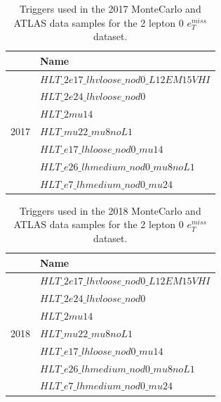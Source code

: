 \begin{table}[H]
    \centering
    \caption[2017 triggers table]{Triggers used in the 2017 MonteCarlo and ATLAS data samples for the 2 lepton 0 $e_T^{miss}$ dataset.}
    \label{tab:triggers2017}
    \begin{tabular}{|l|l|}
    \hline
                            & Name  \\ \hline
    \multirow{7}{*}{2017} & $HLT\_2e17\_lhvloose\_nod0\_L12EM15VHI$                   \\ \cline{2-2} 
                            & $HLT\_2e24\_lhvloose\_nod0$                     \\ \cline{2-2} 
                            & $HLT\_2mu14$                  \\ \cline{2-2} 
                            &  $HLT\_mu22\_mu8noL1$                 \\ \cline{2-2} 
                            &  $HLT\_e17\_lhloose\_nod0\_mu14$                \\ \cline{2-2} 
                            &   $HLT\_e26\_lhmedium\_nod0\_mu8noL1$                \\ \cline{2-2} 
                            
                            & $HLT\_e7\_lhmedium\_nod0\_mu24$      \\ \hline
    \end{tabular}
    \end{table}


\begin{table}[H]
    \centering
    \caption[2018 triggers table]{Triggers used in the 2018 MonteCarlo and ATLAS data samples for the 2 lepton 0 $e_T^{miss}$ dataset.}
    \label{tab:triggers2018}
    \begin{tabular}{|l|l|}
    \hline
                            & Name  \\ \hline
    \multirow{7}{*}{2018} & $HLT\_2e17\_lhvloose\_nod0\_L12EM15VHI$                   \\ \cline{2-2} 
                            & $HLT\_2e24\_lhvloose\_nod0$                     \\ \cline{2-2} 
                            & $HLT\_2mu14$                  \\ \cline{2-2} 
                            &  $HLT\_mu22\_mu8noL1$                  \\ \cline{2-2} 
                            &  $HLT\_e17\_lhloose\_nod0\_mu14$                \\ \cline{2-2} 
                            &   $HLT\_e26\_lhmedium\_nod0\_mu8noL1$                 \\ \cline{2-2} 
                            
                            & $HLT\_e7\_lhmedium\_nod0\_mu24$     \\ \hline
    \end{tabular}
    \end{table}


